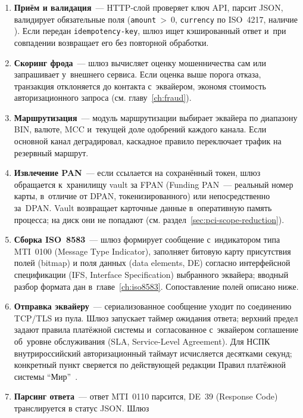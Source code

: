 \begin{enumerate}
  \item \textbf{Приём и валидация}~--- HTTP-слой проверяет
    ключ API, парсит JSON, валидирует обязательные поля
    (\texttt{amount}~>~0, \texttt{currency} по ISO~4217,
    наличие ). Если передан
    \texttt{idempotency-key}, шлюз ищет кэшированный ответ
    и~при совпадении возвращает его без повторной обработки.
  \item \textbf{Скоринг фрода}~--- шлюз вычисляет оценку мошенничества сам или
    запрашивает у~внешнего сервиса. Если оценка выше порога
    отказа, транзакция отклоняется до контакта с~эквайером,
    экономя стоимость авторизационного запроса
    (см. главу~\ref{ch:fraud}).
  \item \textbf{Маршрутизация}~--- модуль маршрутизации выбирает
    эквайера по диапазону BIN, валюте, MCC и~текущей доле
    одобрений каждого канала. Если основной канал деградировал,
    каскадное правило переключает трафик на резервный маршрут.
  \item \textbf{Извлечение PAN}~--- если 
    ссылается на сохранённый токен, шлюз обращается к~хранилищу
    vault за FPAN (Funding PAN~--- реальный номер карты, в~отличие
    от DPAN, токенизированного) или непосредственно за~DPAN. Vault
    возвращает карточные данные в~оперативную память процесса;
    на диск они не попадают
    (см. раздел~\ref{sec:pci-scope-reduction}).
  \item \textbf{Сборка ISO~8583}~--- шлюз формирует сообщение
    с~индикатором типа MTI~0100 (Message Type Indicator),
    заполняет битовую карту присутствия полей (bitmap) и поля
    данных (data elements, DE) согласно интерфейсной спецификации
    (IFS, Interface Specification) выбранного эквайера; вводный
    разбор формата дан в~главе~\ref{ch:iso8583}.
    Сопоставление полей описано ниже.
  \item \textbf{Отправка эквайеру}~--- сериализованное сообщение
    уходит по соединению TCP/TLS из пула. Шлюз запускает
    таймер ожидания ответа; верхний предел задают правила
    платёжной системы и~согласованное с~эквайером соглашение
    об~уровне обслуживания (SLA, Service-Level Agreement).
    Для НСПК внутрироссийский авторизационный таймаут
    исчисляется десятками секунд; конкретный пункт сверяется
    по действующей редакции Правил платёжной системы
    \enquote{Мир}~\cite{nspk-mir-rules}.
  \item \textbf{Парсинг ответа}~--- ответ MTI~0110 парсится,
    DE~39 (Response Code) транслируется в статус JSON. Шлюз

\end{enumerate}
